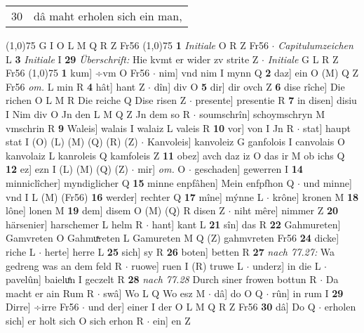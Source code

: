 \documentclass[8pt,a4paper,notitlepage]{article}
\begin{document}
\begin{table}[ht]
\begin{minipage}[t]{0.5\linewidth}
\begin{tabular}{rl}
30 & dâ maht erholen sich ein man,\\ 
\end{tabular}
\scriptsize
\line(1,0){75} \newline
G I O L M Q R Z Fr56 \newline
\line(1,0){75} \newline
\textbf{1} \textit{Initiale} O R Z Fr56   $\cdot$ \textit{Capitulumzeichen} L  \textbf{3} \textit{Initiale} I  \textbf{29} \textit{Überschrift:} Hie kvmt er wider zv strite Z   $\cdot$ \textit{Initiale} G L R Z Fr56  \newline
\line(1,0){75} \newline
\textbf{1} kum] ÷vm O Fr56  $\cdot$ nim] vnd nim I mynn Q \textbf{2} daz] ein O (M) Q Z Fr56 \textit{om.} L min R \textbf{4} hât] hant Z  $\cdot$ dîn] div O \textbf{5} dir] dir ovch Z \textbf{6} dise rîche] Die richen O L M R Die reiche Q Dise risen Z  $\cdot$ presente] presentie R \textbf{7} in disen] disiu I Nim div O Jn den L M Q Z Jn dem so R  $\cdot$ soumschrîn] schoymschryn M vmschrin R \textbf{9} Waleis] walais I walaiz L valeis R \textbf{10} vor] von I Jn R  $\cdot$ stat] haupt stat I (O) (L) (M) (Q) (R) (Z)  $\cdot$ Kanvoleis] kanvoleiz G ganfolois I canvolais O kanvolaiz L kanroleis Q kamfoleis Z \textbf{11} obez] avch daz iz O das ir M ob ichs Q \textbf{12} ez] ezn I (L) (M) (Q) (Z)  $\cdot$ mir] \textit{om.} O  $\cdot$ geschaden] gewerren I \textbf{14} minniclîcher] myndiglicher Q \textbf{15} minne enpfâhen] Mein enfpfhon Q  $\cdot$ und minne] vnd I L (M) (Fr56) \textbf{16} werder] rechter Q \textbf{17} mîne] mýnne L  $\cdot$ krône] kronen M \textbf{18} lône] lonen M \textbf{19} dem] disem O (M) (Q) R disen Z  $\cdot$ niht mêre] nimmer Z \textbf{20} härsenier] harschemer L helm R  $\cdot$ hant] kant L \textbf{21} sîn] das R \textbf{22} Gahmureten] Gamvreten O Gahmuͯreten L Gamureten M Q (Z) gahmvreten Fr56 \textbf{24} dicke] riche L  $\cdot$ herte] herre L \textbf{25} sich] sy R \textbf{26} boten] betten R \textbf{27} \textit{nach 77.27:} Wa gedreng was an dem feld R   $\cdot$ ruowe] ruen I (R) truwe L  $\cdot$ underz] in die L  $\cdot$ pavelûn] baieluͤn I geczelt R \textbf{28} \textit{nach 77.28} Durch siner frowen bottun R   $\cdot$ Da macht er ain Rum R  $\cdot$ swâ] Wo L Q Wo esz M  $\cdot$ dâ] do O Q  $\cdot$ rûn] in rum I \textbf{29} Dirre] ÷irre Fr56  $\cdot$ und der] einer I der O L M Q R Z Fr56 \textbf{30} dâ] Do Q  $\cdot$ erholen sich] er holt sich O sich erhon R  $\cdot$ ein] en Z \newline
\end{minipage}

\end{table}
\end{document}
